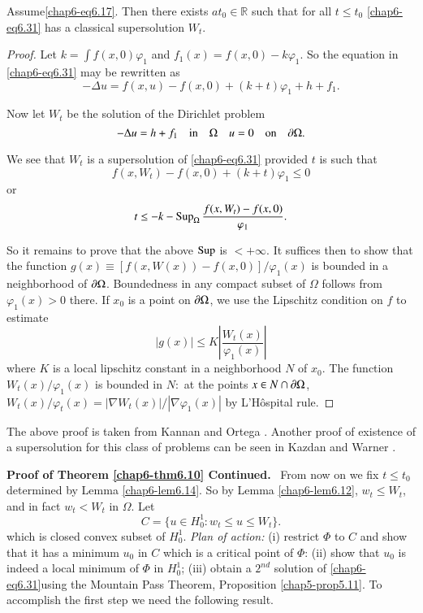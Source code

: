 \begin{lemma}\label{chap6-lem6.14}
Assume\pageoriginale \eqref{chap6-eq6.17}. Then there exists
$at_{0}\in \mathbb{R}$ such that for all $t\leq t_{0}$
\eqref{chap6-eq6.31} has a classical supersolution $W_{t}$.
\end{lemma}

\begin{proof}
Let $k=\int f(x,0)\varphi_{1}$ and $f_{1}(x)=f(x,0)-k\varphi_{1}$. So
the equation in \eqref{chap6-eq6.31} may be rewritten as
\begin{equation*}
-\Delta
u=f(x,u)-f(x,0)+(k+t)\varphi_{1}+h+f_{1}.\tag{6.35}\label{chap6-eq6.35} 
\end{equation*}

Now let $W_{t}$ be the solution of the Dirichlet problem
$$
-\Delta u=h+f_{1}\quad \text{in}\quad \Omega\quad u=0\quad \text{on}\quad \partial \Omega.
$$

We see that $W_{t}$ is a supersolution of \eqref{chap6-eq6.31}
provided $t$ is such that
$$
f(x,W_{t})-f(x,0)+(k+t)\varphi_{1}\leq 0
$$
or
$$
t\leq -k-\operatorname{Sup}_{\Omega}\frac{f(x,W_{t})-f(x,0)}{\varphi_{1}}. 
$$

So it remains to prove that the above $\operatorname{Sup}$ is $<+\infty$. It
suffices then to show that the function $g(x)\equiv
[f(x,W(x))-f(x,0)]/\varphi_{1}(x)$ is bounded in a neighborhood of $\partial
\Omega$. Boundedness in any compact subset of $\Omega$ follows from
$\varphi_{1}(x)>0$ there. If $x_{0}$ is a point on $\partial \Omega$, we use
the Lipschitz condition on $f$ to estimate
$$
|g(x)|\leq K|\frac{W_{t}(x)}{\varphi_{1}(x)}|
$$
where $K$ is a local lipschitz constant in a neighborhood $N$ of
$x_{0}$. The function $W_{t}(x)/\varphi_{1}(x)$ is bounded in $N:$ at
the points $x\in N\cap \partial \Omega$, $W_{t}(x)/\varphi_{t}(x)=|\nabla
W_{t}(x)|/|\nabla \varphi_{1}(x)|$ by L'H\^ospital rule.
\end{proof}

\begin{remark*}
The above proof is taken from Kannan and Ortega \cite{key51}. Another
proof of existence of a supersolution for this class of problems can
be seen in Kazdan and Warner \cite{key52}.
\end{remark*}

\noindent
{\bf Proof of Theorem \ref{chap6-thm6.10} Continued.}~ From now on we
fix $t\leq t_{0}$ determined by Lemma \ref{chap6-lem6.14}. So by Lemma
\ref{chap6-lem6.12}, $w_{t}\leq W_{t}$, and in fact $w_{t}<W_{t}$ in
$\Omega$. Let
\begin{equation*}
C=\{u\in H^{1}_{0}:w_{t}\leq u\leq W_{t}\}.\tag{6.36}\label{chap6-eq6.36}
\end{equation*}
which is closed convex subset of $H^{1}_{0}$. {\em Plan of action:}
(i) restrict $\Phi$ to $C$ and show that it has a minimum $u_{0}$ in
$C$ which is a critical point of $\Phi$: (ii) show that $u_{0}$ is
indeed a local minimum of $\Phi$ in $H^{1}_{0}$; (iii) obtain a
$2^{nd}$ solution of \eqref{chap6-eq6.31}\pageoriginale using the
Mountain Pass Theorem, Proposition \ref{chap5-prop5.11}. To accomplish
the first step we need the following result.

